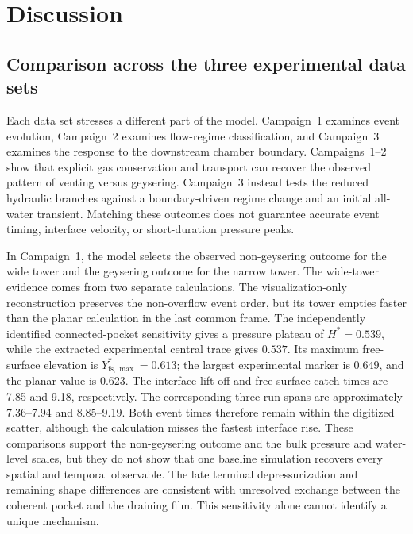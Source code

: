 \section{Discussion}
\label{sec:discussion}

\subsection{Comparison across the three experimental data sets}

Each data set stresses a different part of the model. Campaign~1 examines
event evolution, Campaign~2 examines flow-regime classification, and
Campaign~3 examines the response to the downstream chamber boundary.
Campaigns~1--2 show that explicit gas conservation and transport can recover
the observed pattern of venting versus geysering. Campaign~3 instead tests the
reduced hydraulic branches against a boundary-driven regime change and an
initial all-water transient. Matching these outcomes does not guarantee
accurate event timing, interface velocity, or short-duration pressure peaks.

In Campaign~1, the model selects the observed non-geysering outcome for the
wide tower and the geysering outcome for the narrow tower. The wide-tower
evidence comes from two separate calculations. The visualization-only
reconstruction preserves the non-overflow event order, but its tower empties
faster than the planar calculation in the last common frame. The independently
identified connected-pocket sensitivity gives a pressure plateau of
$H^*=0.539$, while the extracted experimental central trace gives $0.537$.
Its maximum free-surface elevation is $Y^*_{\mathrm{fs},\max}=0.613$; the
largest experimental marker is $0.649$, and the planar value is $0.623$.
The interface lift-off and free-surface catch times are 7.85 and 9.18,
respectively. The corresponding three-run spans are approximately 7.36--7.94
and 8.85--9.19. Both event times therefore remain within the digitized
scatter, although the calculation misses the fastest interface rise. These
comparisons support the non-geysering outcome and the bulk pressure and
water-level scales, but they do not show that one baseline simulation recovers
every spatial and temporal observable. The late terminal depressurization and
remaining shape differences are consistent with unresolved exchange between
the coherent pocket and the draining film. This sensitivity alone cannot
identify a unique mechanism.

